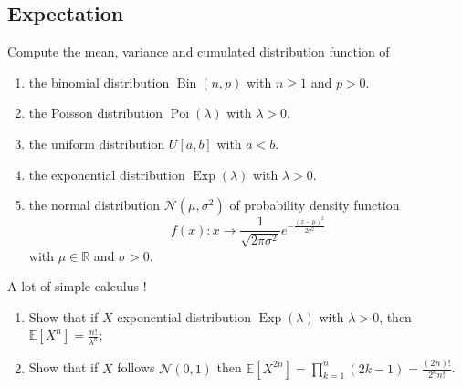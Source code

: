 \begin{center}
  \section*{Expectation}
\end{center}

\begin{Exercise}
  Compute the mean, variance and cumulated distribution function of
  \vspace*{0.2cm}

  \begin{enumerate}
    \item the binomial distribution $\operatorname{Bin}(n, p)$ with $n \geq 1$ and $p>0$.

    \item the Poisson distribution $\operatorname{Poi}(\lambda)$ with $\lambda>0$.

    \item the uniform distribution $U[a, b]$ with $a<b$.

    \item the exponential distribution $\operatorname{Exp}(\lambda)$ with $\lambda>0$.

    \item the normal distribution $\mathcal{N}\left(\mu, \sigma^{2}\right)$ of probability density function
          $$ f(x) : x \to \frac{1}{\sqrt{2\pi \sigma^2}} e^{- \frac{(x-\mu)^2}{2 \sigma^2}}$$
          with $\mu \in \mathbb{R}$ and $\sigma>0$.

  \end{enumerate}
\end{Exercise}

\begin{solution}
  A lot of simple calculus !
\end{solution}

\begin{Exercise}
  \begin{enumerate}
    \item Show that if $X$ exponential distribution $\operatorname{Exp}(\lambda)$ with $\lambda>0$, then $\mathbb{E}\left[X^{n}\right]=\frac{n !}{\lambda^{n}}$;

    \item Show that if $X$ follows $\mathcal{N}(0,1)$ then $\mathbb{E}\left[X^{2 n}\right]=\prod_{k=1}^{n}(2 k-1)=\frac{(2 n) !}{2^{n} n !}$.

  \end{enumerate}
\end{Exercise}

